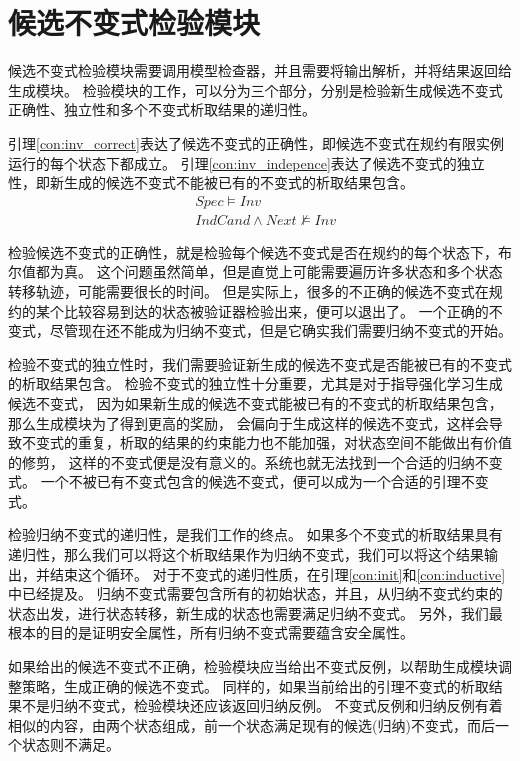 \section{候选不变式检验模块}

候选不变式检验模块需要调用模型检查器，并且需要将输出解析，并将结果返回给生成模块。
检验模块的工作，可以分为三个部分，分别是检验新生成候选不变式正确性、独立性和多个不变式析取结果的递归性。

引理\ref{con:inv_correct}表达了候选不变式的正确性，即候选不变式在规约有限实例运行的每个状态下都成立。
引理\ref{con:inv_indepence}表达了候选不变式的独立性，即新生成的候选不变式不能被已有的不变式的析取结果包含。
\begin{align}
    &Spec \vDash Inv \label{con:inv_correct} \\
    &IndCand \wedge Next \nvDash Inv \label{con:inv_indepence}
\end{align}

检验候选不变式的正确性，就是检验每个候选不变式是否在规约的每个状态下，布尔值都为真。
这个问题虽然简单，但是直觉上可能需要遍历许多状态和多个状态转移轨迹，可能需要很长的时间。
但是实际上，很多的不正确的候选不变式在规约的某个比较容易到达的状态被验证器检验出来，便可以退出了。
一个正确的不变式，尽管现在还不能成为归纳不变式，但是它确实我们需要归纳不变式的开始。

检验不变式的独立性时，我们需要验证新生成的候选不变式是否能被已有的不变式的析取结果包含。
检验不变式的独立性十分重要，尤其是对于指导强化学习生成候选不变式，
因为如果新生成的候选不变式能被已有的不变式的析取结果包含，那么生成模块为了得到更高的奖励，
会偏向于生成这样的候选不变式，这样会导致不变式的重复，析取的结果的约束能力也不能加强，对状态空间不能做出有价值的修剪，
这样的不变式便是没有意义的。系统也就无法找到一个合适的归纳不变式。
一个不被已有不变式包含的候选不变式，便可以成为一个合适的引理不变式。

检验归纳不变式的递归性，是我们工作的终点。
如果多个不变式的析取结果具有递归性，那么我们可以将这个析取结果作为归纳不变式，我们可以将这个结果输出，并结束这个循环。
对于不变式的递归性质，在引理\ref{con:init}和\ref{con:inductive}中已经提及。
归纳不变式需要包含所有的初始状态，并且，从归纳不变式约束的状态出发，进行状态转移，新生成的状态也需要满足归纳不变式。
另外，我们最根本的目的是证明安全属性，所有归纳不变式需要蕴含安全属性。

如果给出的候选不变式不正确，检验模块应当给出不变式反例，以帮助生成模块调整策略，生成正确的候选不变式。
同样的，如果当前给出的引理不变式的析取结果不是归纳不变式，检验模块还应该返回归纳反例。
不变式反例和归纳反例有着相似的内容，由两个状态组成，前一个状态满足现有的候选(归纳)不变式，而后一个状态则不满足。

